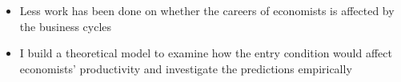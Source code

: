 \documentclass[11pt]{beamer}
\begin{document}
\begin{frame}
\begin{itemize}
			\item Less work has been done on whether the careers of economists is affected by the business cycles
			\item I build a theoretical model to examine how the entry condition would affect economists’ productivity and investigate the predictions empirically

		\end{itemize}
	\end{frame}
\end{document}
